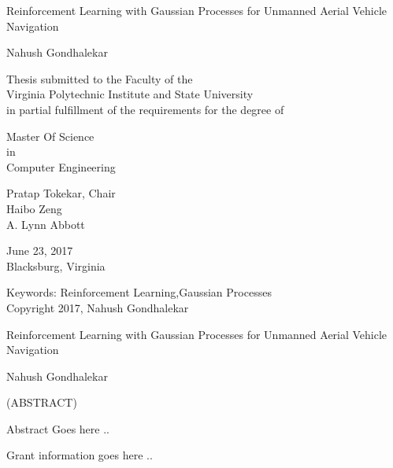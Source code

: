 \documentclass[12pt]{report}
\begin{document}
\thispagestyle{empty}
\begin{center}

{\Large 
Reinforcement Learning with Gaussian Processes for Unmanned Aerial Vehicle Navigation
}

\vfill

Nahush Gondhalekar

\vfill

Thesis submitted to the Faculty of the \\
Virginia Polytechnic Institute and State University \\
in partial fulfillment of the requirements for the degree of

\vfill

Master Of Science \\
in \\
Computer Engineering

\vfill

Pratap Tokekar, Chair \\
Haibo Zeng \\
A. Lynn Abbott

\vfill

June 23, 2017 \\
Blacksburg, Virginia

\vfill

Keywords: Reinforcement Learning,Gaussian Processes 
\\
Copyright 2017, Nahush Gondhalekar

\end{center}

\pagebreak

\thispagestyle{empty}
\begin{center}

{\large Reinforcement Learning with Gaussian Processes for Unmanned Aerial Vehicle Navigation}

\vfill

Nahush Gondhalekar

\vfill

(ABSTRACT)

\vfill

\end{center}

Abstract Goes here ..

\vfill


Grant information goes here ..

\pagebreak

\end{document}
